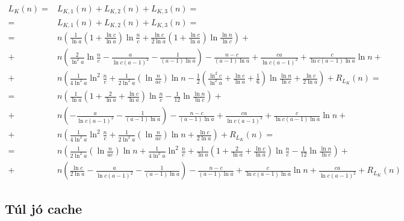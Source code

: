 \documentclass{article}
\begin{document}
\begin{align*}
L_{K}(n) =& L_{K,1}(n) + L_{K,2}(n) + L_{K,3}(n) = \\
=& L_{K,1}(n) + L_{K,2}(n) + L_{K,3}(n) = \\
=& n \left( \frac{1}{\ln{a}} \left( 1 + \frac{\ln{c}}{\ln{a}} \right) \ln{\frac{n}{c}} + \frac{\ln{c}}{2\ln{a}} \left( 1 + \frac{\ln{c}}{\ln{a}} \right) \ln{\frac{\ln{n}}{\ln{c}}} \right) + \\
+& n \left( \frac{2}{\ln^2{a}} \ln{\frac{n}{c}} - \frac{a}{\ln{c} (a-1)^2} - \frac{1}{(a-1) \ln{a}} \right) - \frac{n - c}{(a-1) \ln{a}} + \frac{c a}{\ln{c} (a-1)^2} + \frac{c}{\ln{c} (a-1) \ln{a}} \ln{n} + \\
+& n \left( \frac{1}{4 \ln^2{a}} \ln^2{\frac{n}{c}} + \frac{1}{2 \ln^2{a}} \left( \ln{\frac{n}{a c}} \right) \ln{n} - \frac{1}{2} \left( \frac{\ln^2{c}}{\ln^2{a}} + \frac{\ln{c}}{\ln{a}} + \frac{1}{6} \right) \ln{\frac{\ln{n}}{\ln{c}}} + \frac{\ln{c}}{2 \ln{a}} \right) + R_{L_{K}}(n) = \\
=& n \left( \frac{1}{\ln{a}} \left( 1 + \frac{2}{\ln{a}} + \frac{\ln{c}}{\ln{a}} \right) \ln{\frac{n}{c}} - \frac{1}{12} \ln{\frac{\ln{n}}{\ln{c}}} \right) + \\
+& n \left( - \frac{a}{\ln{c} (a-1)^2} - \frac{1}{(a-1) \ln{a}} \right) - \frac{n - c}{(a-1) \ln{a}} + \frac{c a}{\ln{c} (a-1)^2} + \frac{c}{\ln{c} (a-1) \ln{a}} \ln{n} + \\
+& n \left( \frac{1}{4 \ln^2{a}} \ln^2{\frac{n}{c}} + \frac{1}{2 \ln^2{a}} \left( \ln{\frac{n}{a c}} \right) \ln{n} + \frac{\ln{c}}{2 \ln{a}} \right) + R_{L_{K}}(n) = \\
=& n \left( \frac{1}{2 \ln^2{a}} \left( \ln{\frac{n}{a c}} \right) \ln{n} + \frac{1}{4 \ln^2{a}} \ln^2{\frac{n}{c}} + \frac{1}{\ln{a}} \left( 1 + \frac{2}{\ln{a}} + \frac{\ln{c}}{\ln{a}} \right) \ln{\frac{n}{c}} - \frac{1}{12} \ln{\frac{\ln{n}}{\ln{c}}} \right) + \\
+& n \left( \frac{\ln{c}}{2 \ln{a}} - \frac{a}{\ln{c} (a-1)^2} - \frac{1}{(a-1) \ln{a}} \right) - \frac{n - c}{(a-1) \ln{a}} + \frac{c}{\ln{c} (a-1) \ln{a}} \ln{n} + \frac{c a}{\ln{c} (a-1)^2} + R_{L_{K}}(n)
\end{align*}

\subsection{Túl jó cache}
\end{document}
